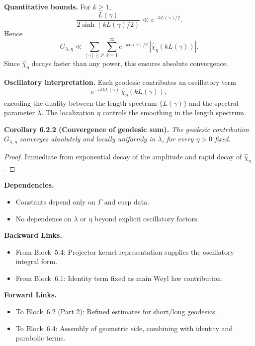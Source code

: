 \medskip

\noindent\textbf{Quantitative bounds.}
For $k\ge 1$,
\[
  \frac{L(\gamma)}{2\sinh(kL(\gamma)/2)} \ll e^{-kL(\gamma)/2}.
\]
Hence
\[
  G_{\lambda,\eta} \ll \sum_{[\gamma]\in \mathcal{P}} \sum_{k=1}^\infty
  e^{-kL(\gamma)/2}\, |\widehat{\chi}_\eta(kL(\gamma))|.
\]
Since $\widehat{\chi}_\eta$ decays faster than any power,
this ensures absolute convergence.

\medskip

\noindent\textbf{Oscillatory interpretation.}
Each geodesic contributes an oscillatory term
\[
  e^{-i\lambda kL(\gamma)}\, \widehat{\chi}_\eta(kL(\gamma)),
\]
encoding the duality between the length spectrum $\{L(\gamma)\}$ and the spectral parameter $\lambda$.
The localization $\eta$ controls the smoothing in the length spectrum.

\medskip

\noindent\textbf{Corollary 6.2.2 (Convergence of geodesic sum).}
\emph{The geodesic contribution $G_{\lambda,\eta}$ converges absolutely and locally uniformly in $\lambda$, for every $\eta>0$ fixed.}

\begin{proof}
Immediate from exponential decay of the amplitude and rapid decay of $\widehat{\chi}_\eta$.
\end{proof}

\medskip

\noindent\textbf{Dependencies.}
\begin{itemize}
  \item Constants depend only on $\Gamma$ and cusp data.
  \item No dependence on $\lambda$ or $\eta$ beyond explicit oscillatory factors.
\end{itemize}

\medskip

\noindent\textbf{Backward Links.}
\begin{itemize}
  \item From Block~5.4: Projector kernel representation supplies the oscillatory integral form.
  \item From Block~6.1: Identity term fixed as main Weyl law contribution.
\end{itemize}

\medskip

\noindent\textbf{Forward Links.}
\begin{itemize}
  \item To Block~6.2 (Part 2): Refined estimates for short/long geodesics.
  \item To Block~6.4: Assembly of geometric side, combining with identity and parabolic terms.
\end{itemize}

